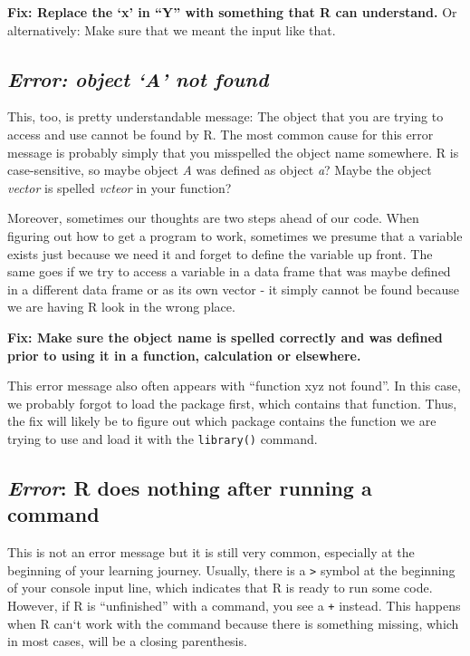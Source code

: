 \documentclass[
]{book}
\begin{document}
\textbf{Fix: Replace the `x' in ``Y'' with something that R can understand.} Or alternatively: Make sure that we meant the input like that.

\subsection*{\texorpdfstring{\emph{Error: object `A' not found}}{Error: object `A' not found}}\label{error-object-a-not-found}

This, too, is pretty understandable message:
The object that you are trying to access and use cannot be found by R.
The most common cause for this error message is probably simply that you misspelled the object name somewhere.
R is case-sensitive, so maybe object \emph{A} was defined as object \emph{a}?
Maybe the object \emph{vector} is spelled \emph{vcteor} in your function?

Moreover, sometimes our thoughts are two steps ahead of our code.
When figuring out how to get a program to work, sometimes we presume that a variable exists just because we need it and forget to define the variable up front.
The same goes if we try to access a variable in a data frame that was maybe defined in a different data frame or as its own vector - it simply cannot be found because we are having R look in the wrong place.

\textbf{Fix: Make sure the object name is spelled correctly and was defined prior to using it in a function, calculation or elsewhere.}

This error message also often appears with ``function xyz not found''.
In this case, we probably forgot to load the package first, which contains that function.
Thus, the fix will likely be to figure out which package contains the function we are trying to use and load it with the \texttt{library()} command.

\subsection*{\texorpdfstring{\emph{Error}: R does nothing after running a command}{Error: R does nothing after running a command}}\label{error-r-does-nothing-after-running-a-command}

This is not an error message but it is still very common, especially at the beginning of your learning journey.
Usually, there is a \texttt{\textgreater{}} symbol at the beginning of your console input line, which indicates that R is ready to run some code.
However, if R is ``unfinished'' with a command, you see a \texttt{+} instead.
This happens when R can`t work with the command because there is something missing, which in most cases, will be a closing parenthesis.
\end{document}
